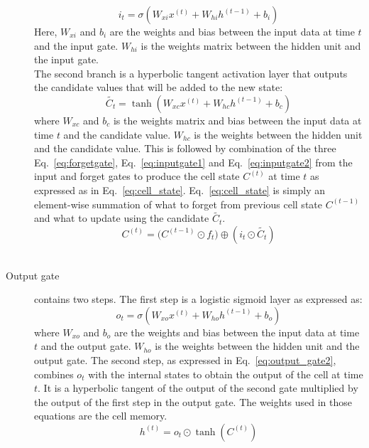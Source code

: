 \documentclass[sigconf, nonacm, natbib, screen, balance=False]{acmart}
\begin{document}
\begin{description}
\begin{equation}
     i_t = \sigma{(W_{xi} x^{(t)}+ W_{hi}h^{(t-1)} + b_i)} 
    \label{eq:inputgate1}
\end{equation} 
Here, $W_{xi}$ and $b_{i}$ are the weights and bias between the input data at time $t$ and the input gate. $W_{hi}$ is the weights matrix between the hidden unit and the input gate.
\hfill\\
The second branch is a hyperbolic tangent activation layer that outputs the candidate values that will be added to the new state:
\begin{equation}
     \tilde{C_t} = \tanh{(W_{xc} x^{(t)}+ W_{hc}h^{(t-1)} + b_c)} 
    \label{eq:inputgate2}
\end{equation} 
where $W_{xc}$ and $b_{c}$ is the weights matrix and bias between the input data at time $t$ and the candidate value. $W_{hc}$ is the weights between the hidden unit and the candidate value.
This is followed by combination of the three Eq.~\ref{eq:forgetgate}, Eq.~\ref{eq:inputgate1} and Eq.~\ref{eq:inputgate2}  from the input and forget  gates to produce the cell state $C^{(t)}$ at time $t$ as expressed as in Eq.~\ref{eq:cell_state}. Eq.~\ref{eq:cell_state} is simply an element-wise summation of what to forget from previous cell state $C^{(t-1)}$ and what to update using the candidate $\tilde{C_t}$.
\begin{equation}
     C^{(t)} = (C^{(t-1)} \odot{f_t) \oplus (i_t \odot \tilde{C_t})} 
    \label{eq:cell_state}
\end{equation} 
\hfill\\
\item [Output gate] contains two steps. The first step is a logistic sigmoid layer as expressed as:
\begin{equation}
     o_t = \sigma{(W_{xo} x^{(t)}+ W_{ho}h^{(t-1)} + b_o)} 
    \label{eq:output_gate1}
\end{equation} 
where $W_{xo}$ and $b_{o}$ are the weights and bias between the input data at time $t$ and the output gate. $W_{ho}$ is the weights between the hidden unit and the output gate.
The second step, as expressed in Eq.~\ref{eq:output_gate2}, combines $o_t$ with the internal states to obtain the output of the cell at time $t$. It is a hyperbolic tangent of the output of the second gate multiplied by the output of the first step in the output gate. The weights used in those equations are the cell memory.
\begin{equation}
     h^{(t)} = o_t \odot \tanh{(C^{(t)})} 
    \label{eq:output_gate2}
\end{equation} 
\end{description}
\end{document}
